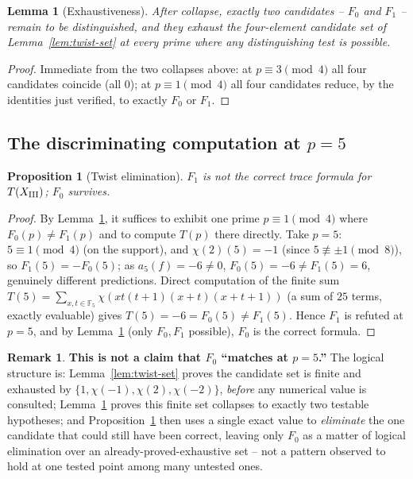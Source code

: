 \documentclass[11pt]{amsart}
\newtheorem{proposition}[theorem]{Proposition}
\newtheorem{lemma}[theorem]{Lemma}
\theoremstyle{definition}
\newtheorem{remark}[theorem]{Remark}
\begin{document}
\begin{lemma}[Exhaustiveness]
\label{lem:exhaustive}
After collapse, exactly two candidates -- $F_0$ and $F_1$ -- remain to be
distinguished, and they exhaust the four-element candidate set of
Lemma~\ref{lem:twist-set} at every prime where any distinguishing test is
possible.
\end{lemma}

\begin{proof}
Immediate from the two collapses above: at $p\equiv3\pmod4$ all four
candidates coincide (all $0$); at $p\equiv1\pmod4$ all four candidates
reduce, by the identities just verified, to exactly $F_0$ or $F_1$.
\end{proof}

\subsection{The discriminating computation at $p=5$}

\begin{proposition}[Twist elimination]
\label{prop:twist-elim}
$F_1$ is not the correct trace formula for $T(X_{\rm III})$; $F_0$ survives.
\end{proposition}

\begin{proof}
By Lemma~\ref{lem:exhaustive}, it suffices to exhibit one prime
$p\equiv1\pmod4$ where $F_0(p)\neq F_1(p)$ and to compute $T(p)$ there
directly. Take $p=5$: $5\equiv1\pmod4$ (on the support), and
$\chi(2)(5)=-1$ (since $5\not\equiv\pm1\pmod8$), so $F_1(5)=-F_0(5)$; as
$a_5(f)=-6\neq0$, $F_0(5)=-6\neq F_1(5)=6$, genuinely different
predictions. Direct computation of the finite sum $T(5)=\sum_{x,t\in\mathbb{F}_5}
\chi(xt(t+1)(x+t)(x+t+1))$ (a sum of $25$ terms, exactly evaluable) gives
$T(5)=-6=F_0(5)\neq F_1(5)$. Hence $F_1$ is refuted at $p=5$, and by
Lemma~\ref{lem:exhaustive} (only $F_0,F_1$ possible), $F_0$ is the
correct formula.
\end{proof}

\begin{remark}
\textbf{This is not a claim that $F_0$ ``matches at $p=5$.''} The logical
structure is: Lemma~\ref{lem:twist-set} proves the candidate set is
finite and exhausted by $\{1,\chi(-1),\chi(2),\chi(-2)\}$, \emph{before}
any numerical value is consulted; Lemma~\ref{lem:exhaustive} proves this
finite set collapses to exactly two testable hypotheses; and
Proposition~\ref{prop:twist-elim} then uses a single exact value to
\emph{eliminate} the one candidate that could still have been correct,
leaving only $F_0$ as a matter of logical elimination over an
already-proved-exhaustive set -- not a pattern observed to hold at one
tested point among many untested ones.
\end{remark}
\end{document}
